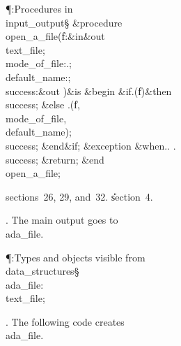 \Y\P\?\4:Procedures in \\{input\_output}\X\S\?\6
\&{procedure}\8\1\\{open\_a\_file}\?(\?\|f\?:\&{in}\?\8\&{out}\8\\{text\_file};%
\?\,\?\\{mode\_of\_file}\?:\?\?.\?;\?\,\?%
\\{default\_name}\?:\?;\?\,\1\?\\{success}\?:\?\&{out}\8%
\?\2)\?\2\8\&{is}\8\1\6
\4\&{begin}\6
\&{if}\1\1\8\?.\?\?\1(\?\|f\?\2)\?\2\8\&{then}\6
\\{success}\?\K\?;\6
\4\&{else}\6
\?.\?\?\1(\?\?\KR\?\|f\?,\?\?\KR\?%
\\{mode\_of\_file}\?,\?\?\KR\?\\{default\_name}\?\2)\?;\5
\\{success}\?\K\?;\2\6
\&{end}\8\2\&{if}\1;\6
\1\4\&{exception}\6
\4\&{when}\8\?.\?\?\mathrel{\.|}\?\?.%
\?\?\mathrel{\.|}\?\?.\?\KR\6
\\{success}\?\K\?;\5
\&{return};\2\6
\&{end}\8\\{open\_a\_file};\par
\A sections~26, 29, and~32.
\U section~4\*.\fi

. The main output goes to \\{ada\_file}.

\Y\P\?\4:Types and objects visible from \\{data\_structures}\X\mathrel{+}\S%
\?\6
\\{ada\_file}\?:\?\\{text\_file};\par
\fi

. The following code creates \\{ada\_file}.

